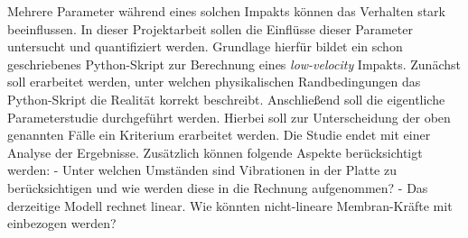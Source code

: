Mehrere Parameter während eines solchen Impakts können das Verhalten stark beeinflussen. In dieser Projektarbeit sollen die Einflüsse dieser Parameter untersucht und quantifiziert werden. Grundlage hierfür bildet ein schon geschriebenes Python-Skript zur Berechnung eines \textit{low-velocity} Impakts. Zunächst soll erarbeitet werden, unter welchen physikalischen Randbedingungen das Python-Skript die Realität korrekt beschreibt. Anschließend soll die eigentliche Parameterstudie durchgeführt werden. Hierbei soll zur Unterscheidung der oben genannten Fälle ein Kriterium erarbeitet werden. Die Studie endet mit einer Analyse der Ergebnisse.
Zusätzlich können folgende Aspekte berücksichtigt werden: 
- Unter welchen Umständen sind Vibrationen in der Platte zu berücksichtigen und wie werden diese in die Rechnung aufgenommen?
- Das derzeitige Modell rechnet linear. Wie könnten nicht-lineare Membran-Kräfte mit einbezogen werden?
	

